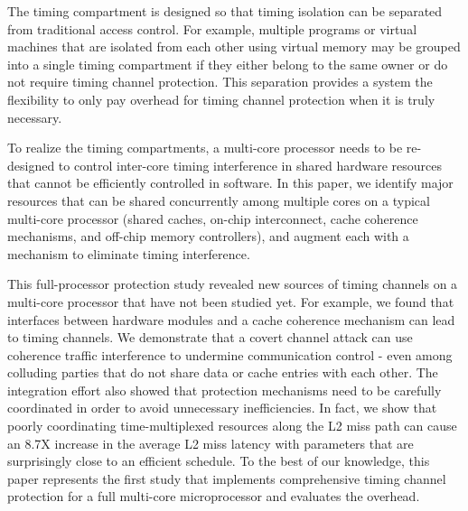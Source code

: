 The timing compartment is designed so that timing isolation can be
separated from traditional access control. For example, multiple programs or
virtual machines that are isolated from each other using virtual memory may
be grouped into a single timing compartment if they either belong to the 
same owner or do not require timing channel protection. 
This separation provides a system the flexibility to only pay overhead for
timing channel protection when it is truly necessary.

To realize the timing compartments, a multi-core processor needs to be
re-designed to control inter-core timing interference in shared hardware
resources that cannot be efficiently controlled in software.
In this paper, we identify major resources that can be shared concurrently among
multiple cores on a typical multi-core processor (shared caches,
on-chip interconnect, cache coherence mechanisms, and off-chip memory 
controllers),
and augment each with a mechanism
to eliminate timing interference.

This full-processor protection study revealed new sources of timing
channels on a multi-core processor that have not been studied yet.
For example, we found that interfaces between hardware modules and 
a cache coherence mechanism can lead to timing channels. We demonstrate
that a covert channel attack can use coherence traffic interference to 
undermine communication control - even among colluding parties that do not 
share data or cache entries with each other.
The integration effort also showed that protection mechanisms need to
be carefully coordinated in order to avoid unnecessary inefficiencies.
In fact, we show that poorly coordinating time-multiplexed resources along the 
L2 miss path can cause an 8.7X increase in the average L2 miss latency with 
parameters that are surprisingly close to an efficient schedule.
To the best of our knowledge, this paper represents the first study
that implements comprehensive timing channel protection for a full 
multi-core microprocessor and evaluates the overhead.


